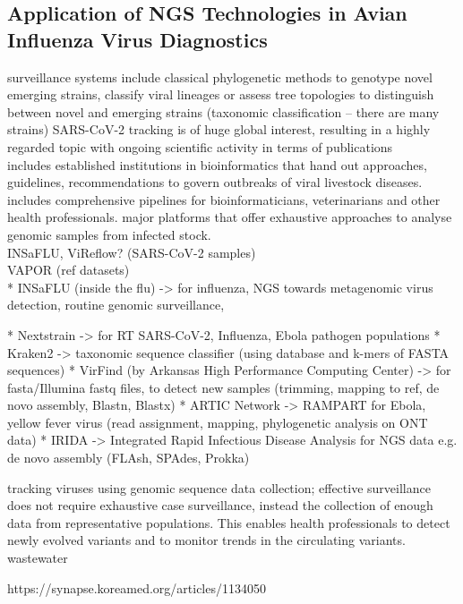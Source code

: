 \subsection{Application of NGS Technologies in Avian Influenza Virus Diagnostics}
surveillance systems include classical phylogenetic methods to genotype novel emerging strains, classify viral lineages or assess tree topologies to distinguish between novel and emerging strains (taxonomic classification -- there are many strains)
SARS-CoV-2 tracking is of huge global interest, resulting in a highly regarded topic with ongoing scientific activity in terms of publications \\
includes established institutions in bioinformatics that hand out approaches, guidelines, recommendations to govern outbreaks of viral livestock diseases. includes comprehensive pipelines for bioinformaticians, veterinarians and other health professionals.
major platforms that offer exhaustive approaches to analyse genomic samples from infected stock. \\

INSaFLU, ViReflow? (SARS-CoV-2 samples) \\
 VAPOR (ref datasets) \\

* INSaFLU (inside the flu) -> for influenza, NGS towards metagenomic virus detection, routine genomic surveillance, 

* Nextstrain -> for RT SARS-CoV-2, Influenza, Ebola pathogen populations 
* Kraken2 -> taxonomic sequence classifier (using database and k-mers of FASTA sequences)
* VirFind (by Arkansas High Performance Computing Center) -> for fasta/Illumina fastq files, to detect new samples (trimming, mapping to ref, de novo assembly, Blastn, Blastx)
* ARTIC Network -> RAMPART for Ebola, yellow fever virus (read assignment, mapping, phylogenetic analysis on ONT data)
* IRIDA -> Integrated Rapid Infectious Disease Analysis for NGS data e.g. de novo assembly (FLAsh, SPAdes, Prokka)

tracking viruses using genomic sequence data collection; effective surveillance does not require exhaustive case surveillance, instead the collection of enough data from representative populations. This enables health professionals to detect newly evolved variants and to monitor trends in the circulating variants.\\
wastewater

https://synapse.koreamed.org/articles/1134050
